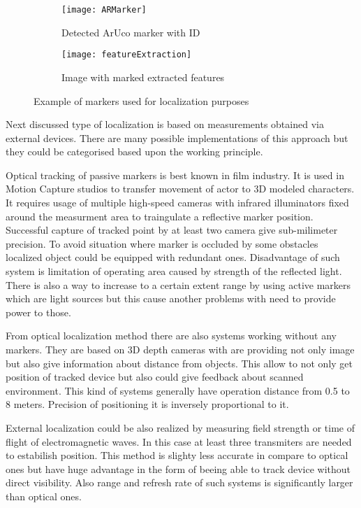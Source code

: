 \documentclass[printmode,en]{mgr}
\begin{document}
\begin{figure}[!ht]
\centering
\begin{subfigure}{.5\textwidth}
  \centering
  \texttt{[image: ARMarker]}
  \caption{Detected ArUco marker with ID \cite{ArUco}}
  \label{fig:ARMarker}
\end{subfigure}%
\begin{subfigure}{.5\textwidth}
  \centering
  \texttt{[image: featureExtraction]}
  \caption{Image with marked extracted features}
  \label{fig:featureExtraction}
\end{subfigure}
\caption{Example of markers used for localization purposes}
\label{fig:markerBasedLocalization}
\end{figure}

Next discussed type of localization is based on measurements obtained via external devices. There are many possible implementations of this approach but they could be categorised based upon the working principle.

Optical tracking of passive markers \cite{MoCap} is best known in film industry. It is used in Motion Capture studios to transfer movement of actor to 3D modeled characters. It requires usage of multiple high-speed cameras with infrared illuminators fixed around the measurment area to traingulate a reflective marker position. Successful capture of tracked point by at least two camera give sub-milimeter precision. To avoid situation where marker is occluded by some obstacles localized object could be equipped with redundant ones. Disadvantage of such system is limitation of operating area caused by strength of the reflected light. There is also a way to increase to a certain extent range by using active markers which are light sources but this cause another problems with need to provide power to those.

From optical localization method there are also systems working without any markers. They are based on 3D depth cameras with are providing not only image but also give information about distance from objects. This allow to not only get position of tracked device but also could give feedback about scanned environment. This kind of systems generally have operation distance from 0.5 to 8 meters. Precision of positioning it is inversely proportional to it.

External localization could be also realized by measuring field strength or time of flight of electromagnetic waves. In this case at least three transmiters are needed to estabilish position. This method is slighty less accurate in compare to optical ones but have huge advantage in the form of beeing able to track device without direct visibility. Also range and refresh rate of such systems is significantly larger than optical ones.
\end{document}
